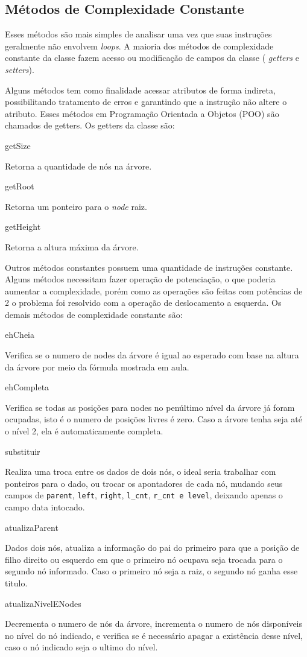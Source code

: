\subsection{Métodos de Complexidade Constante}

Esses métodos são mais simples de analisar uma vez que suas instruções 
geralmente não envolvem \emph{loops}. A maioria dos métodos de complexidade
constante da classe fazem acesso ou modificação de campos da classe (\emph{
getters} e \emph{setters}). 

Alguns métodos tem como finalidade acessar atributos de forma indireta, 
possibilitando tratamento de erros e garantindo que a instrução não altere 
o atributo. Esses métodos em Programação Orientada a Objetos (POO) são 
chamados de getters. Os getters da classe são:

\textsf{getSize}

Retorna a quantidade de nós na árvore.

\textsf{getRoot}

Retorna um ponteiro para o \emph{node} raiz.

\textsf{getHeight}

Retorna a altura máxima da árvore.

Outros métodos constantes possuem uma quantidade de instruções constante. 
Alguns métodos necessitam fazer operação de potenciação, o que poderia aumentar 
a complexidade, porém como as operações são feitas com potências de 2 o 
problema foi resolvido com a operação de deslocamento a esquerda. Os demais 
métodos de complexidade constante são:

\textsf{ehCheia}

Verifica se o numero de nodes da árvore é igual ao esperado com base na altura 
da árvore por meio da fórmula mostrada em aula.

\textsf{ehCompleta}

Verifica se todas as posições para nodes no penúltimo nível da árvore já foram 
ocupadas, isto é o numero de posições livres é zero.
Caso a árvore tenha seja até o nível 2, ela é automaticamente completa.

\textsf{substituir}

Realiza uma troca entre os dados de dois nós, o ideal seria trabalhar com 
ponteiros para o dado, ou trocar os apontadores de cada nó, mudando seus campos 
de \texttt{parent}, \texttt{left}, \texttt{right}, \texttt{l\_cnt}, 
\texttt{r\_cnt e level}, deixando apenas o campo data intocado.

\textsf{atualizaParent}

Dados dois nós, atualiza a informação do pai do primeiro para que a posição de 
filho direito ou esquerdo em que o primeiro nó ocupava seja trocada para o 
segundo nó informado.
Caso o primeiro nó seja a raiz, o segundo nó ganha esse titulo.

\textsf{atualizaNivelENodes}

Decrementa o numero de nós da árvore, incrementa o numero de nós disponíveis no 
nível do nó indicado, e verifica se é necessário apagar a existência desse 
nível, caso o nó indicado seja o ultimo do nível.


